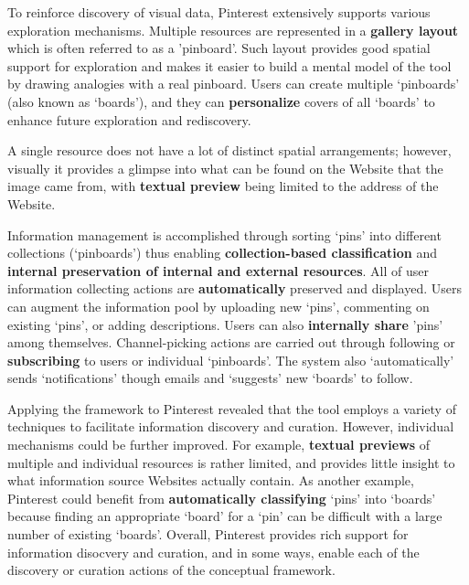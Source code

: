 {To reinforce discovery of visual data, Pinterest extensively supports various exploration mechanisms. Multiple resources are represented in a \textbf{gallery layout} which is often referred to as a 'pinboard'. Such layout provides good spatial support for exploration and makes it easier to build a mental model of the tool by drawing analogies with a real pinboard. Users can create multiple `pinboards' (also known as `boards'), and they can \textbf{personalize} covers of all `boards' to enhance future exploration and rediscovery.

A single resource does not have a lot of distinct spatial arrangements; however, visually it provides a glimpse into what can be found on the Website that the image came from, with \textbf{textual preview} being limited to the address of the Website. 

Information management is accomplished through sorting `pins' into different collections (`pinboards') thus enabling \textbf{collection-based classification} and \textbf{internal preservation of internal and external resources}. All of user information collecting actions are \textbf{automatically} preserved and displayed. Users can augment the information pool by uploading new `pins', commenting on existing `pins', or adding descriptions. Users can also \textbf{internally share} 'pins' among themselves. Channel-picking actions are carried out through following or \textbf{subscribing} to users or individual `pinboards'. The system also `automatically' sends `notifications' though emails and `suggests' new `boards' to follow.

Applying the framework to Pinterest revealed that the tool employs a  variety of techniques to facilitate information discovery and curation. However, individual mechanisms could be further improved. For example, \textbf{textual previews} of multiple and individual resources is rather limited, and provides little insight to what information source Websites actually contain. As another example, Pinterest could benefit from \textbf{automatically classifying} `pins' into `boards' because finding an appropriate `board' for a `pin' can be difficult with a large number of existing `boards'. Overall, Pinterest provides rich support for information disocvery and curation, and in some ways, enable each of the discovery or curation actions of the conceptual framework. 
} %


